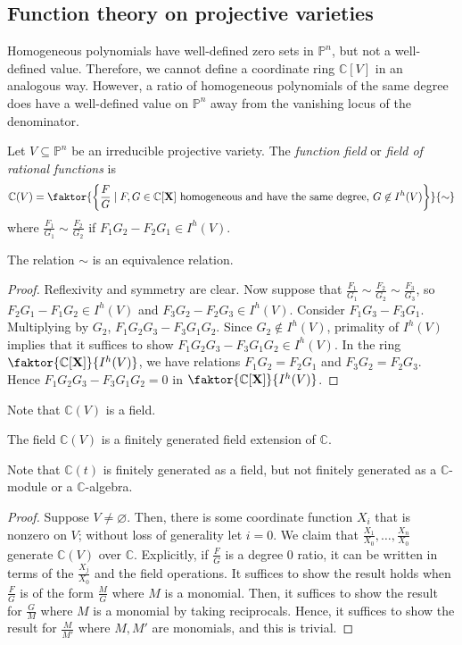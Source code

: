 \subsection{Function theory on projective varieties}
Homogeneous polynomials have well-defined zero sets in \( \mathbb P^n \), but not a well-defined value.
Therefore, we cannot define a coordinate ring \( \mathbb C[V] \) in an analogous way.
However, a ratio of homogeneous polynomials of the same degree does have a well-defined value on \( \mathbb P^n \) away from the vanishing locus of the denominator.
\begin{definition}
    Let \( V \subseteq \mathbb P^n \) be an irreducible projective variety.
    The \emph{function field} or \emph{field of rational functions} is
    \[ \mathbb C(V) = \faktor{\qty{\frac{F}{G} \mid F, G \in \mathbb C[\vb X] \text{ homogeneous and have the same degree, } G \not\in I^h(V)}}{\sim} \]
    where \( \frac{F_1}{G_1} \sim \frac{F_2}{G_2} \) if \( F_1 G_2 - F_2 G_1 \in I^h(V) \).
\end{definition}
\begin{lemma}
    The relation \( \sim \) is an equivalence relation.
\end{lemma}
\begin{proof}
    Reflexivity and symmetry are clear.
    Now suppose that \( \frac{F_1}{G_1} \sim \frac{F_2}{G_2} \sim \frac{F_3}{G_3} \), so \( F_2 G_1 - F_1 G_2 \in I^h(V) \) and \( F_3 G_2 - F_2 G_3 \in I^h(V) \).
    Consider \( F_1 G_3 - F_3 G_1 \).
    Multiplying by \( G_2 \), \( F_1 G_2 G_3 - F_3 G_1 G_2 \).
    Since \( G_2 \not\in I^h(V) \), primality of \( I^h(V) \) implies that it suffices to show \( F_1 G_2 G_3 - F_3 G_1 G_2 \in I^h(V) \).
    In the ring \( \faktor{\mathbb C[\vb X]}{I^h(V)} \), we have relations \( F_1 G_2 = F_2 G_1 \) and \( F_3 G_2 = F_2 G_3 \).
    Hence \( F_1 G_2 G_3 - F_3 G_1 G_2 = 0 \) in \( \faktor{\mathbb C[\vb X]}{I^h(V)} \).
\end{proof}
Note that \( \mathbb C(V) \) is a field.
\begin{proposition}
    The field \( \mathbb C(V) \) is a finitely generated field extension of \( \mathbb C \).
\end{proposition}
Note that \( \mathbb C(t) \) is finitely generated as a field, but not finitely generated as a \( \mathbb C \)-module or a \( \mathbb C \)-algebra.
\begin{proof}
    Suppose \( V \neq \varnothing \).
    Then, there is some coordinate function \( X_i \) that is nonzero on \( V \); without loss of generality let \( i = 0 \).
    We claim that \( \frac{X_1}{X_0}, \dots, \frac{X_n}{X_0} \) generate \( \mathbb C(V) \) over \( \mathbb C \).
    Explicitly, if \( \frac{F}{G} \) is a degree 0 ratio, it can be written in terms of the \( \frac{X_j}{X_0} \) and the field operations.
    It suffices to show the result holds when \( \frac{F}{G} \) is of the form \( \frac{M}{G} \) where \( M \) is a monomial.
    Then, it suffices to show the result for \( \frac{G}{M} \) where \( M \) is a monomial by taking reciprocals.
    Hence, it suffices to show the result for \( \frac{M}{M'} \) where \( M, M' \) are monomials, and this is trivial.
\end{proof}
